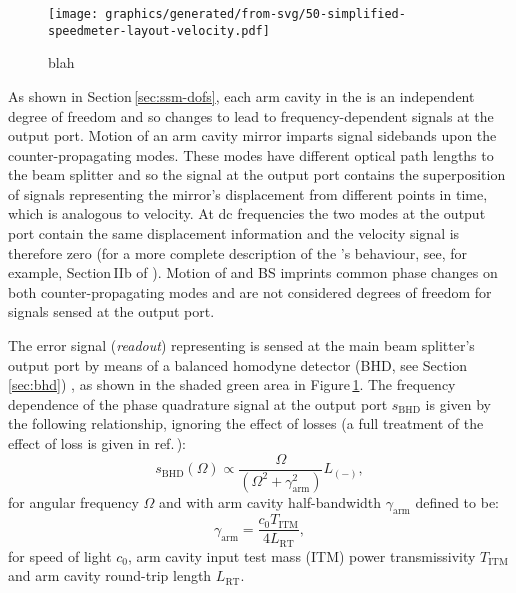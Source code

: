 \begin{figure}
  \centering
  \texttt{[image: graphics/generated/from-svg/50-simplified-speedmeter-layout-velocity.pdf]}
  \caption{\label{fig:simplified-speedmeter-layout-velocity}blah}
\end{figure}

As shown in Section\,\ref{sec:ssm-dofs}, each arm cavity in the \SSM{} is an independent degree of freedom and so changes to \LMINUS{} lead to frequency-dependent signals at the output port. Motion of an arm cavity mirror imparts signal sidebands upon the counter-propagating modes. These modes have different optical path lengths to the beam splitter and so the signal at the output port contains the superposition of signals representing the mirror's displacement from different points in time, which is analogous to velocity. At dc frequencies the two modes at the output port contain the same displacement information and the velocity signal is therefore zero (for a more complete description of the \SSM{}'s behaviour, see, for example, Section\,IIb of \cite{Chen2003}). Motion of \MINT{} and BS imprints common phase changes on both counter-propagating modes and are not considered degrees of freedom for signals sensed at the output port.

The error signal (\emph{readout}) representing \LMINUS{} is sensed at the main beam splitter's output port by means of a balanced homodyne detector (\gls{BHD}, see Section\,\ref{sec:bhd}) \cite{Steinlechner2015}, as shown in the shaded green area in Figure\,\ref{fig:simplified-speedmeter-layout-velocity}. The frequency dependence of the phase quadrature signal at the output port $s_{\textrm{BHD}}$ is given by the following relationship, ignoring the effect of losses (a full treatment of the effect of loss is given in ref.\,\cite{Danilishin2015}):
\begin{equation}
  \label{eq:asymdarmbhdresponse}
  s_{\textrm{BHD}} \left( \Omega \right) \propto \frac{\Omega}{ \left(\Omega^2 + \gamma_{\textrm{arm}}^2 \right)} L_{\left(-\right)},
\end{equation}
for angular frequency $\Omega$ and with arm cavity half-bandwidth $\gamma_{\textrm{arm}}$ defined to be:
\begin{equation}
  \gamma_{\textrm{arm}} = \frac{c_{0} T_{\textrm{ITM}}}{4 L_{\textrm{RT}}},
\end{equation}
for speed of light $c_{0}$, arm cavity input test mass (\gls{ITM}) power transmissivity $T_{\textrm{ITM}}$ and arm cavity round-trip length $L_{\textrm{RT}}$.
   
